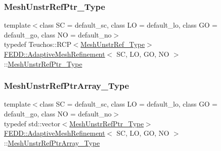 \subsubsection{\texorpdfstring{Mesh\+Unstr\+Ref\+Ptr\+\_\+\+Type}{MeshUnstrRefPtr\_Type}}
{\footnotesize\ttfamily template$<$class SC = default\+\_\+sc, class LO = default\+\_\+lo, class GO = default\+\_\+go, class NO = default\+\_\+no$>$ \\
typedef Teuchos\+::\+R\+CP$<$\hyperlink{classFEDD_1_1AdaptiveMeshRefinement_ade0625d6a1aa9c3586f3b04abb0a9e5e}{Mesh\+Unstr\+Ref\+\_\+\+Type}$>$ \hyperlink{classFEDD_1_1AdaptiveMeshRefinement}{F\+E\+D\+D\+::\+Adaptive\+Mesh\+Refinement}$<$ SC, LO, GO, NO $>$\+::\hyperlink{classFEDD_1_1AdaptiveMeshRefinement_ad166d4fc2a5e64ed6c4b5ee3941c77bf}{Mesh\+Unstr\+Ref\+Ptr\+\_\+\+Type}}

\mbox{\label{classFEDD_1_1AdaptiveMeshRefinement_a9d1410723e7af7a2835cc294934fba65}} 
\subsubsection{\texorpdfstring{Mesh\+Unstr\+Ref\+Ptr\+Array\+\_\+\+Type}{MeshUnstrRefPtrArray\_Type}}
{\footnotesize\ttfamily template$<$class SC = default\+\_\+sc, class LO = default\+\_\+lo, class GO = default\+\_\+go, class NO = default\+\_\+no$>$ \\
typedef std\+::vector$<$\hyperlink{classFEDD_1_1AdaptiveMeshRefinement_ad166d4fc2a5e64ed6c4b5ee3941c77bf}{Mesh\+Unstr\+Ref\+Ptr\+\_\+\+Type}$>$ \hyperlink{classFEDD_1_1AdaptiveMeshRefinement}{F\+E\+D\+D\+::\+Adaptive\+Mesh\+Refinement}$<$ SC, LO, GO, NO $>$\+::\hyperlink{classFEDD_1_1AdaptiveMeshRefinement_a9d1410723e7af7a2835cc294934fba65}{Mesh\+Unstr\+Ref\+Ptr\+Array\+\_\+\+Type}}

\mbox{\label{classFEDD_1_1AdaptiveMeshRefinement_afba165f2caa97c6de40654b1ee51e38d}} 
